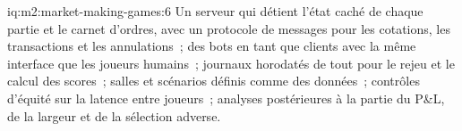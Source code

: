 \begin{solution}{iq:m2:market-making-games:6}
Un serveur qui détient l'état caché de chaque partie et le carnet d'ordres, avec un protocole de messages pour
les cotations, les transactions et les annulations~; des bots en tant que clients avec la même interface que les joueurs humains~;
journaux horodatés de tout pour le rejeu et le calcul des scores~; salles et scénarios définis comme
des données~; contrôles d'équité sur la latence entre joueurs~; analyses postérieures à la partie du P\&L, de la largeur et
de la sélection adverse.
\end{solution}
